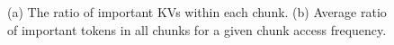 %





\begin{figure}
	\centering
	\hspace{0.03in}
	\caption{
		(a) The ratio of important KVs within each chunk. 
		(b) Average ratio of important tokens in all chunks for a given chunk access frequency.}
	\label{fig:cha2}
\end{figure}


